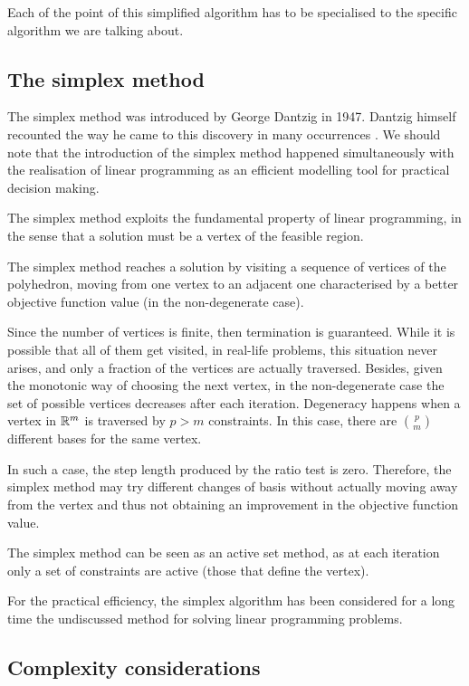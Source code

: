 Each of the point of this simplified algorithm has to be specialised
to the specific algorithm we are talking about.

%
%
\subsection{The simplex method}

The simplex method was introduced by George Dantzig in 1947. Dantzig
himself recounted the way he came to this discovery
in many occurrences \cite{Dantzig02}. We should note that the
introduction of the simplex method happened simultaneously with
the realisation of linear programming as an efficient modelling tool
for practical decision making. 

The simplex method exploits the fundamental property of linear
programming, in the sense that a solution must be a vertex of
the feasible region.

The simplex method reaches a solution by visiting a sequence of 
vertices of the polyhedron, moving from one vertex to an adjacent 
one characterised by a better objective function value
(in the non-degenerate case). 

Since the number of vertices is finite, then termination is guaranteed.
While it is possible that all of them get visited, in real-life problems, 
this situation never arises, and only a fraction of the vertices are
actually traversed.
Besides, given the monotonic
way of choosing the next vertex, in the non-degenerate case the set 
of possible vertices decreases after each iteration. Degeneracy
happens when a vertex in $\mathbb{R}^m$ is traversed by $p > m$ constraints.
In this case, there are $\binom{p}{m}$ different bases for the same
vertex. 


In such a case, the step length produced by the ratio test
is zero. Therefore, the simplex method
may try different changes of basis without actually moving away
from the vertex and thus not obtaining an improvement in the objective
function value.

The simplex method can be seen as an active set method, as at each
iteration only a set of constraints are active (those that define
the vertex).

For the practical efficiency, the simplex algorithm has been considered
for a long time the undiscussed method for solving linear programming
problems.


%
%
\subsection{Complexity considerations}

